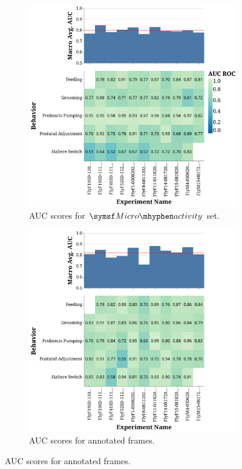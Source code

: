 \begin{figure}[h]
	\centering
	\begin{subfigure}[b]{0.495\linewidth}
		\centering\includegraphics[width=\linewidth]{figures/AUC_ROC-DActfiltered.pdf}
		\caption{AUC scores for $\MicroActivity$ set. \label{figure:AUC-ROC-Act}}
	\end{subfigure}%
	\hfill
	\begin{subfigure}[b]{0.495\linewidth}
		\centering\includegraphics[width=\linewidth]{figures/AUC_ROC-DAnnfiltered.pdf}
		\caption{AUC scores for annotated frames. \label{figure:AUC-ROC-Ann}}
	\end{subfigure}%


\end{figure}
